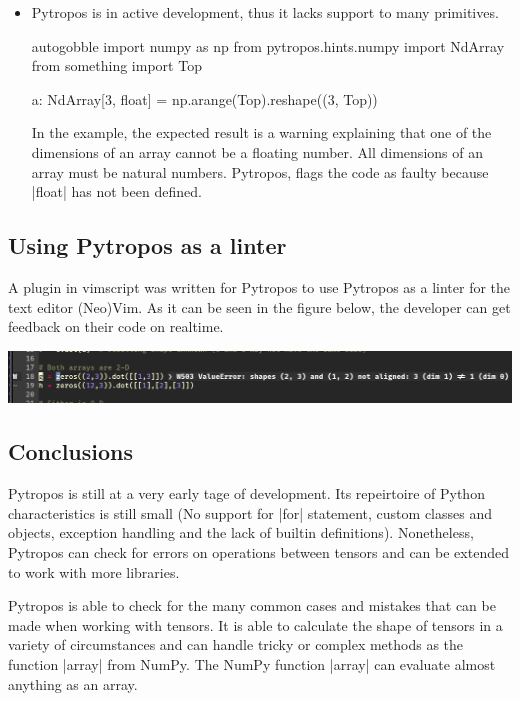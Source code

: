\begin{itemize}
\item Pytropos is in active development, thus it lacks support to many primitives.

  \begin{pythoncode*}{autogobble}
    import numpy as np
    from pytropos.hints.numpy import NdArray
    from something import Top

    a: NdArray[3, float] = np.arange(Top).reshape((3, Top))
  \end{pythoncode*}

  In the example, the expected result is a warning explaining that one of the dimensions
  of an array cannot be a floating number. All dimensions of an array must be natural
  numbers. Pytropos, flags the code as faulty because \pycode|float| has not been defined.

\end{itemize}


\subsection{Using Pytropos as a linter}

A plugin in vimscript was written for Pytropos to use Pytropos as a linter for the text
editor (Neo)Vim. As it can be seen in the figure below, the developer can get feedback on
their code on realtime.

\noindent
\includegraphics[width=\textwidth]{figures/neovim-linter.png}

%

\subsection*{Conclusions}

Pytropos is still at a very early tage of development. Its repeirtoire of Python
characteristics is still small (No support for \pycode|for| statement, custom classes and
objects, exception handling and the lack of builtin definitions). Nonetheless, Pytropos
can check for errors on operations between tensors and can be extended to work with more
libraries.

Pytropos is able to check for the many common cases and mistakes that can be made when
working with tensors. It is able to calculate the shape of tensors in a variety of
circumstances and can handle tricky or complex methods as the function \pycode|array| from
NumPy. The NumPy function \pycode|array| can evaluate almost anything as an array.
